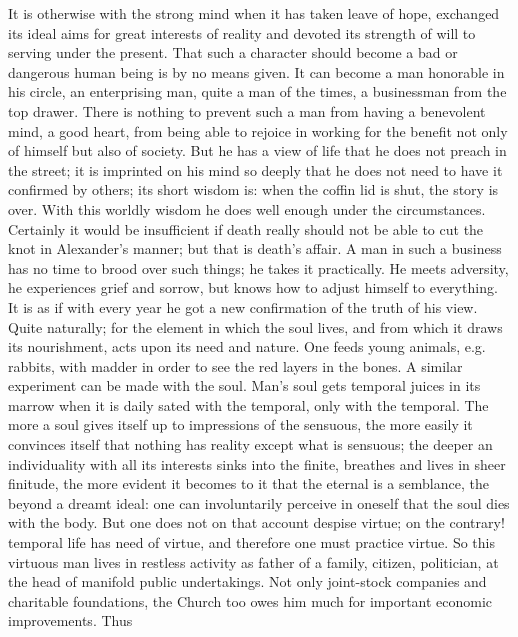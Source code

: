 \documentclass[12pt,a4paper,openany]{book}
\newcommand{\opage}[1]{\marginnote{\footnotesize\textit{[#1]}}}
\begin{document}
It is otherwise with the strong mind when it has taken
leave of hope, exchanged its ideal aims for
great interests of reality and devoted its strength of will to
serving under the present. That such a character
should become a bad or dangerous human being is by no means
given. It can become a man honorable in his circle,
an enterprising man, quite a man of the times, a businessman
from the top drawer. There is nothing to prevent such a
man from having a benevolent mind, a good heart, from
being able to rejoice in working for the benefit not only
of himself but also of society. But he has
a view of life that he does not preach in the street; it
is imprinted on his mind so deeply that he does not need
\setcounter{footnote}{0}%
\opage{28}to have it confirmed by others; its short wisdom
is: when the coffin lid is shut, the story is over. With
this worldly wisdom he does well enough under the circumstances.
Certainly it would be insufficient if
death really should not be able to cut the
knot in Alexander's manner; but that is death's
affair. A man in such a business has no time to
brood over such things; he takes it practically. He meets
adversity, he experiences grief and sorrow, but knows how
to adjust himself to everything. It is as if with every
year he got a new confirmation of the truth of his view.
Quite naturally; for the element in which the soul lives,
and from which it draws its nourishment, acts upon its
need and nature. One feeds young animals, e.g. rabbits,
with madder in order to see the red layers in the bones. A
similar experiment can be made with the soul. Man's
soul gets temporal juices in its marrow when it is daily
sated with the temporal, only with the temporal. The more a
soul gives itself up to impressions of the sensuous, the more
easily it convinces itself that nothing has reality
except what is sensuous; the deeper an individuality
with all its interests sinks into the finite,
breathes and lives in sheer finitude, the more evident
it becomes to it that the eternal is a semblance, the beyond
a dreamt ideal: one can involuntarily perceive in
oneself that the soul dies with the body. But one does not on that account
despise virtue; on the contrary! temporal life has
need of virtue, and therefore one must practice virtue. So
this virtuous man lives in restless activity as
father of a family, citizen, politician, at the head of manifold
public undertakings. Not only joint-stock companies
and charitable foundations, the Church too owes him much for important
\setcounter{footnote}{0}%
\opage{29}economic improvements. Thus
\end{document}

